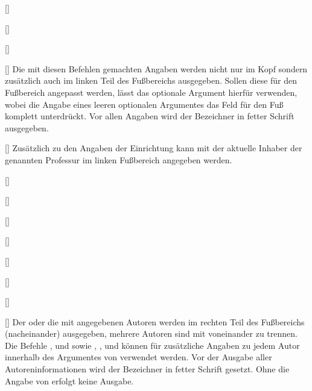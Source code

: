 \begin{Bundle*}[v2.05]{}
\begin{Declaration}{%
  []%
}
\begin{Declaration}{%
  []%
}
\begin{Declaration}{%
  []%
}
\begin{Declaration}{%
  []%
}
\printdeclarationlist%
%
Die mit diesen Befehlen gemachten Angaben werden nicht nur im Kopf sondern 
zusätzlich auch im linken Teil des Fußbereichs ausgegeben. Sollen diese für den 
Fußbereich angepasst werden, lässt das optionale Argument hierfür verwenden, 
wobei die Angabe eines leeren optionalen Argumentes das Feld für den Fuß 
komplett unterdrückt. Vor allen Angaben wird der Bezeichner  
in fetter Schrift ausgegeben.
\end{Declaration}
\end{Declaration}
\end{Declaration}
\end{Declaration}


\begin{Declaration}{[]}
\printdeclarationlist%
%
Zusätzlich zu den Angaben der Einrichtung kann mit  der 
aktuelle Inhaber der genannten Professur im linken Fußbereich angegeben werden.
\end{Declaration}

\begin{Declaration}{[]}
\begin{Declaration}{[]}
\begin{Declaration}{[]}
\begin{Declaration}{[]}
\begin{Declaration}{[]}
\begin{Declaration}{[]}
\begin{Declaration}{[]}
\begin{Declaration}{[]}
\printdeclarationlist%
%
Der oder die mit  angegebenen Autoren werden im rechten Teil des 
Fußbereichs (nacheinander) ausgegeben, mehrere Autoren sind mit  
voneinander zu trennen. Die Befehle ,  und 
 sowie , ,  und 
 können für zusätzliche Angaben zu jedem Autor innerhalb 
des Argumentes von  verwendet werden. Vor der Ausgabe aller 
Autoreninformationen wird der Bezeichner  in fetter Schrift 
gesetzt. Ohne die Angabe von  erfolgt keine Ausgabe. 


\end{Declaration}
\end{Declaration}
\end{Declaration}
\end{Declaration}
\end{Declaration}
\end{Declaration}
\end{Declaration}
\end{Declaration}
\end{Bundle*}
